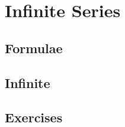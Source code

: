 \section{Infinite Series}
\noindent{}
\subsection{Formulae}
\subsection{Infinite}
%
\subsection{Exercises}

\newpage
